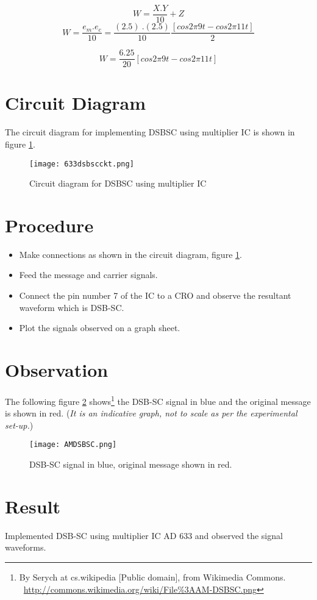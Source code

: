 \begin{equation}
W=\frac{X.Y}{10}+Z
\end{equation}
\begin{equation}
W=\frac{e_m.e_c}{10}=\frac{(2.5) \ .(2.5)}{10}\frac{[cos 2\pi9t-cos 2\pi11t]}{2}
\end{equation}

\begin{equation}
W=\frac{6.25}{20}[cos 2\pi9t-cos 2\pi11t]
\end{equation} 

\section*{Circuit Diagram}
The circuit diagram for implementing DSBSC using multiplier IC is shown in figure \ref{DSBSCckt}.
\begin{figure}[h]
\begin{center}
\texttt{[image: 633dsbscckt.png]}
\caption{Circuit diagram for DSBSC using multiplier IC}
\label{DSBSCckt}
\end{center}

\end{figure}

\section*{Procedure}
\begin{itemize}
\item
Make connections as shown in the circuit diagram, figure \ref{DSBSCckt}.
\item
Feed the message and carrier signals.
\item
Connect the pin number 7 of the IC to a CRO and observe the resultant waveform which is DSB-SC.
\item

Plot the signals observed on a graph sheet.
\end{itemize}
\section*{Observation}

The following figure \ref{DSBSC} shows\footnote{By Serych at cs.wikipedia [Public domain], from Wikimedia Commons.  \ \url{http://commons.wikimedia.org/wiki/File\%3AAM-DSBSC.png}} the DSB-SC signal in blue and the original message is shown in red. (\emph{It is an indicative graph, not to scale as per the experimental set-up.})
\begin{figure}[h]
\begin{center}
\texttt{[image: AMDSBSC.png]}
\caption{DSB-SC signal in blue, original message shown in red.}
\label{DSBSC}
\end{center}

\end{figure}


\section*{Result}
Implemented DSB-SC using multiplier IC AD 633 and observed the signal waveforms.